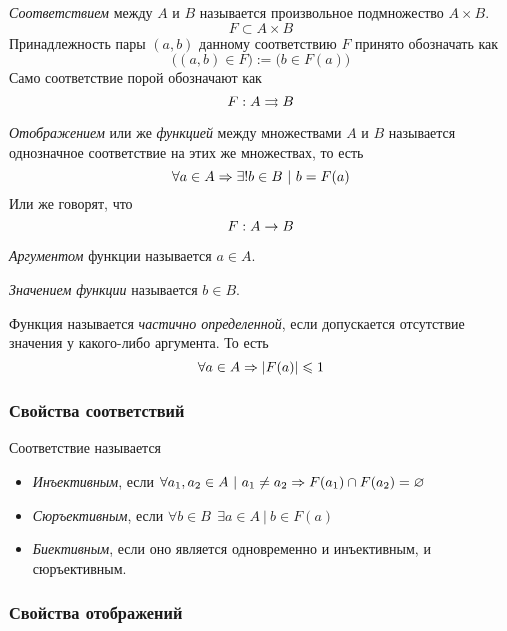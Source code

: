 \begin{definition}
	\textit{Соответствием} между $A$ и $B$ называется произвольное подмножество $A \times B$.
	$$
		F \subset A \times B
	$$
	Принадлежность пары $(a, b)$ данному соответствию $F$ принято обозначать как
	$$
		\big((a, b) \in F\big) := \big(b \in F(a)\big)
	$$
	Само соответствие порой обозначают как
	$$
		F : A \rightrightarrows B
	$$
\end{definition}

\begin{definition}
	\textit{Отображением} или же \textit{функцией} между множествами $A$ и $B$ называется однозначное соответствие на этих же множествах, то есть
	$$
		\forall a \in A \Rightarrow \exists! b \in B\ |\ b = F(a)
	$$
	Или же говорят, что
	$$
		F : A \rightarrow B
	$$
\end{definition}

\begin{definition}
	\textit{Аргументом} функции называется $a \in A$.
\end{definition}

\begin{definition}
	\textit{Значением функции} называется $b \in B$.
\end{definition}

\begin{definition}
	Функция называется \textit{частично определенной}, если допускается отсутствие значения у какого-либо аргумента. То есть
	$$
		\forall a \in A \Rightarrow |F(a)| \leqslant 1
	$$
\end{definition}

\subsubsection*{Свойства соответствий}

Соответствие называется
\begin{itemize}
	\item \textit{Инъективным}, если $\forall a_1, a_2 \in A\ |\ a_1 \neq a_2 \Rightarrow F(a_1) \cap F(a_2) = \varnothing$
	\item \textit{Сюръективным}, если $\forall b \in B\ \ \exists a \in A\ |\ b \in F(a)$
	\item \textit{Биективным}, если оно является одновременно и инъективным, и сюръективным.
\end{itemize}

\subsubsection*{Свойства отображений}

